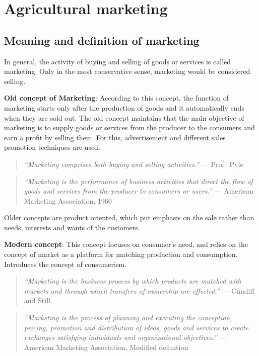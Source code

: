 \documentclass[11pt,]{book}
\theoremstyle{definition}
\theoremstyle{definition}
\theoremstyle{definition}
\theoremstyle{remark}
\begin{document}
\chapter{Agricultural marketing}\label{agricultural-marketing}

\section{Meaning and definition of
marketing}\label{meaning-and-definition-of-marketing}

In general, the activity of buying and selling of goods or services is
called marketing. Only in the most conservative sense, marketing would
be considered selling.

\textbf{Old concept of Marketing}: \newline According to this concept,
the function of marketing starts only after the production of goods and
it automatically ends when they are sold out. The old concept maintains
that the main objective of marketing is to supply goods or services from
the producer to the consumers and earn a profit by selling them. For
this, advertisement and different sales promotion techniques are used.

\begin{quote}
\emph{``Marketing comprises both buying and selling activities.''} ---
Prof.~Pyle
\end{quote}

\begin{quote}
\emph{``Marketing is the performance of business activities that direct
the flow of goods and services from the producer to consumers or
users.''} --- American Marketing Association, 1960
\end{quote}

Older concepts are product oriented, which put emphasis on the sale
rather than needs, interests and wants of the customers.

\textbf{Modern concept}: \newline This concept focuses on consumer's
need, and relies on the concept of market as a platform for matching
production and consumption. Introduces the concept of consumerism.

\begin{quote}
\emph{``Marketing is the business process by which products are matched
with markets and through which transfers of ownership are effected.''}
--- Cundiff and Still
\end{quote}

\begin{quote}
\emph{``Marketing is the process of planning and executing the
conception, pricing, promotion and distribution of ideas, goods and
services to create exchanges satisfying individuals and organizational
objectives.''} --- American Marketing Association, Modified definition
\end{quote}
\end{document}
